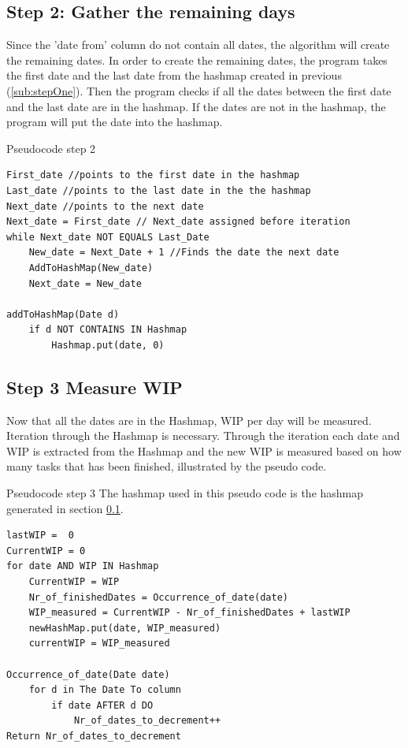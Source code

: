 \documentclass[UKenglish]{ifimaster}  %
\begin{document}
\subsection{Step 2: Gather the remaining days}
 \label{sub:stepTwo}
Since the 'date from' column do not contain all dates, the algorithm will create the remaining dates.  
In order to create the remaining dates, the program takes the first date and the last date from the hashmap created in previous (\ref{sub:stepOne}). Then the program checks if all the dates between the first date and the last date are in the hashmap. If the dates are not in the hashmap, the program will put the date into the hashmap.

Pseudocode step 2
 \begin{lstlisting}
First_date //points to the first date in the hashmap 
Last_date //points to the last date in the the hashmap 
Next_date //points to the next date
Next_date = First_date // Next_date assigned before iteration
while Next_date NOT EQUALS Last_Date
	New_date = Next_Date + 1 //Finds the date the next date
	AddToHashMap(New_date)
	Next_date = New_date

addToHashMap(Date d)
	if d NOT CONTAINS IN Hashmap
		Hashmap.put(date, 0) 
 \end{lstlisting}

\subsection{Step 3 Measure WIP}
Now that all the dates are in the Hashmap, WIP per day will be measured. Iteration through the Hashmap is necessary. Through the iteration each date and WIP is extracted from the Hashmap and the new WIP is measured based on how many tasks that has been finished, illustrated by the pseudo code.

Pseudocode step 3
The hashmap used in this pseudo code is the hashmap generated in section \ref{sub:stepTwo}.

\begin{lstlisting}
lastWIP =  0
CurrentWIP = 0
for date AND WIP IN Hashmap	
	CurrentWIP = WIP 
	Nr_of_finishedDates = Occurrence_of_date(date)  
	WIP_measured = CurrentWIP - Nr_of_finishedDates + lastWIP
	newHashMap.put(date, WIP_measured)
	currentWIP = WIP_measured 

Occurrence_of_date(Date date)
	for d in The Date To column
		if date AFTER d DO
			Nr_of_dates_to_decrement++
Return Nr_of_dates_to_decrement 
 \end{lstlisting}
\end{document}
